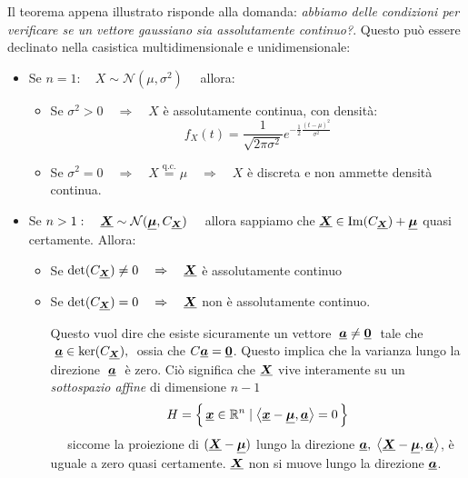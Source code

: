 Il teorema appena illustrato risponde alla domanda: \textit{abbiamo delle condizioni per verificare se un vettore gaussiano sia assolutamente continuo?}. Questo può essere declinato nella casistica multidimensionale e unidimensionale:
\begin{itemize}
    \item Se $n=1:\quad X\sim \mathcal{N}(\mu, \sigma^2)\quad$ allora:
    \begin{itemize}
        \item Se $\sigma^2 >0 \quad \Rightarrow \quad X$ è assolutamente continua, con densità:
        \[f_X(t) = \frac{1}{\sqrt{2\pi\sigma^2}} e^{-\frac{1}{2}\frac{(t-\mu)^2}{\sigma^2}}\]
        \item Se $\sigma^2 =0 \quad \Rightarrow \quad X \overset{\text{q.c.}}{=}\mu\quad \Rightarrow \quad X$ è discreta e non ammette densità continua.
    \end{itemize}
    \item Se $n>1:\quad \underline{{\boldsymbol{X}}} \sim \mathcal{N}(\underline{{\boldsymbol{\mu}}}, C_{\underline{{\boldsymbol{X}}}})\quad$ allora sappiamo che $\underline{{\boldsymbol{X}}}\in \text{Im}(C_{\underline{{\boldsymbol{X}}}}) + \underline{{\boldsymbol{\mu}}}$ quasi certamente. Allora:
    \begin{itemize}
        \item Se $\det(C_{\underline{{\boldsymbol{X}}}}) \neq 0\quad \Rightarrow \quad \underline{{\boldsymbol{X}}}$ è assolutamente continuo
        \item Se $\det(C_{\underline{{\boldsymbol{X}}}}) = 0\quad \Rightarrow \quad \underline{{\boldsymbol{X}}}$ non è assolutamente continuo. 

        \medskip 
        \noindent Questo vuol dire che esiste sicuramente un vettore $\;\underline{{\boldsymbol{a}}}\neq \underline{{\boldsymbol{0}}}\;$ tale che $\;\underline{{\boldsymbol{a}}} \in \ker(C_{\underline{{\boldsymbol{X}}}}),\;$ ossia che $C\underline{{\boldsymbol{a}}} = \underline{{\boldsymbol{0}}}$. Questo implica che la varianza lungo la direzione $\;\underline{{\boldsymbol{a}}}\;$ è zero. Ciò significa che $\underline{{\boldsymbol{X}}}$ vive interamente su un \textit{sottospazio affine} di dimensione $n-1$
        \[H = \Bigl\{\,\underline{{\boldsymbol{x}}}\in\mathbb{R}^n\mid \left\langle\underline{{\boldsymbol{x}}} - \underline{{\boldsymbol{\mu}}}, \underline{{\boldsymbol{a}}}\right\rangle = 0\,\Bigr\}\]
        $\quad$ siccome la proiezione di $(\underline{{\boldsymbol{X}}}-\underline{{\boldsymbol{\mu}}})$ lungo la direzione $\underline{{\boldsymbol{a}}},\;\left\langle\underline{{\boldsymbol{X}}} - \underline{{\boldsymbol{\mu}}}, \underline{{\boldsymbol{a}}}\right\rangle$, è uguale a zero quasi certamente. $\underline{{\boldsymbol{X}}}$ non si muove lungo la direzione $\underline{{\boldsymbol{a}}}$.  
    \end{itemize}
\end{itemize}

